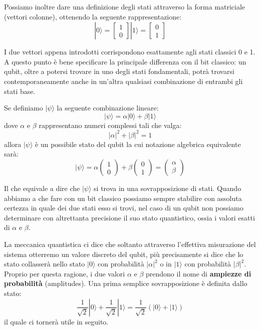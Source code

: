 Possiamo inoltre dare una definizione degli stati attraverso la forma matriciale (vettori colonne), ottenendo la seguente rappresentazione:
\[
  | 0 \rangle = \begin{bmatrix} 1 \\ 0 \end{bmatrix}
  | 1 \rangle = \begin{bmatrix} 0 \\ 1 \end{bmatrix}
\]

I due vettori appena introdotti corrispondono esattamente agli stati classici 0 e 1. A questo punto è bene specificare la principale differenza con il bit classico: un qubit, oltre a potersi trovare in uno degli stati fondamentali, potrà trovarsi contemporaneamente anche in un'altra qualsiasi combinazione di entrambi gli stati base.

Se definiamo \( | \psi \rangle \) la seguente combinazione lineare:
\[
  | \psi \rangle = \alpha | 0 \rangle + \beta | 1 \rangle
\]
dove \(\alpha\) e \(\beta\) rappresentano numeri complessi tali che valga:
\[
  \lvert \alpha \rvert ^2 + \lvert \beta \rvert ^2 = 1
\]
allora \( | \psi \rangle \) è un possibile stato del qubit la cui notazione algebrica equivalente sarà:
\[
  | \psi \rangle
  = \alpha \begin{pmatrix} 1 \\ 0 \end{pmatrix}
  + \beta \begin{pmatrix} 0 \\ 1 \end{pmatrix}
  = \begin{pmatrix} \alpha \\ \beta \end{pmatrix}
\]

Il che equivale a dire che \( | \psi \rangle \) si trova in una sovrapposizione di stati. Quando abbiamo a che fare con un bit classico possiamo sempre stabilire con assoluta certezza in quale dei due stati esso si trovi, nel caso di un qubit non possiamo determinare con altrettanta precisione il suo stato quantistico, ossia i valori esatti di \(\alpha\) e \(\beta\).

La meccanica quantistica ci dice che soltanto attraverso l'effettiva misurazione del sistema otterremo un valore discreto del qubit, più precisamente si dice che lo stato collasserà nello stato \( | 0 \rangle \) con probabilità \( \lvert \alpha \rvert ^2 \) o in \( | 1 \rangle \) con probabilità \( \lvert \beta \rvert ^2 \). Proprio per questa ragione, i due valori \(\alpha\) e \(\beta\) prendono il nome di \textbf{ampiezze di probabilità} (amplitudes). Una prima semplice sovrapposizione è definita dallo stato:
\[
  \frac{1}{\sqrt{2}} | 0 \rangle
  + \frac{1}{\sqrt{2}} | 1 \rangle
  = \frac{1}{\sqrt{2}} (| 0 \rangle + | 1 \rangle)
\]
il quale ci tornerà utile in seguito.

